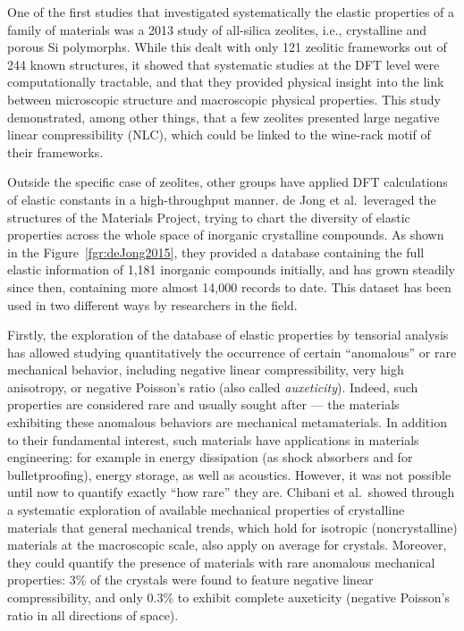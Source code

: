 \documentclass[main.tex]{subfiles}
\begin{document}
One of the first studies that investigated systematically the elastic properties of a family of materials was a 2013 study of all-silica zeolites,\autocite{Coudert_2013} i.e., crystalline and porous Si polymorphs. While this dealt with only 121 zeolitic frameworks out of 244 known structures, it showed that systematic studies at the DFT level were computationally tractable, and that they provided physical insight into the link between microscopic structure and macroscopic physical properties. This study demonstrated, among other things, that a few zeolites presented large negative linear compressibility (NLC), which could be linked to the wine-rack motif of their frameworks.

Outside the specific case of zeolites, other groups have applied DFT calculations of elastic constants in a high-throughput manner. de Jong et al.\ leveraged the structures of the Materials Project\autocite{Matgenome, Jain_2013}, trying to chart the diversity of elastic properties across the whole space of inorganic crystalline compounds.\autocite{deJong_2015} As shown in the Figure~\ref{fgr:deJong2015}, they provided a database containing the full elastic information of 1,181 inorganic compounds initially, and has grown steadily since then, containing more almost 14,000 records to date.\autocite{MaterialsProject} This dataset has been used in two different ways by researchers in the field.

Firstly, the exploration of the database of elastic properties by tensorial analysis has allowed studying quantitatively the occurrence of certain ``anomalous'' or rare mechanical behavior, including negative linear compressibility, very high anisotropy, or negative Poisson's ratio (also called \emph{auxeticity}). Indeed, such properties are considered rare and usually sought after --- the materials exhibiting these anomalous behaviors are mechanical metamaterials.\autocite{Coudert_2019} In addition to their fundamental interest, such materials have applications in materials engineering: for example in energy dissipation (as shock absorbers and for bulletproofing), energy storage, as well as acoustics.\autocite{Surjadi_2018} However, it was not possible until now to quantify exactly ``how rare'' they are. Chibani et al.\ showed through a systematic exploration of available mechanical properties of crystalline materials that general mechanical trends, which hold for isotropic (noncrystalline) materials at the macroscopic scale, also apply on average for crystals. Moreover, they could quantify the presence of materials with rare anomalous mechanical properties: {3\%} of the crystals were found to feature negative linear compressibility, and only {0.3\%} to exhibit complete auxeticity (negative Poisson's ratio in all directions of space).
\end{document}
